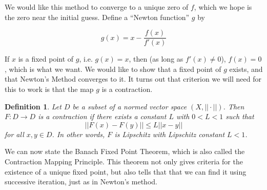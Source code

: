 \documentclass[10pt]{article}         %
\newtheorem{definition}{Definition}[section]
\theoremstyle{remark}
\begin{document}
We would like this method to converge to a unique zero of $f$, which we hope is the zero near the initial guess. Define a ``Newton function'' $g$ by

\[
g(x) = x - \frac{f(x)}{f'(x)}
\]

If $x$ is a fixed point of $g$, i.e. $g(x) = x$, then (as long as $f'(x) \neq 0$), $f(x) = 0$, which is what we want. We would like to show that a fixed point of $g$ exists, and that Newton's Method converges to it. It turns out that criterion we will need for this to work is that the map $g$ is a contraction.

\begin{definition}Let $D$ be a subset of a normed vector space $(X, ||\cdot||)$. Then $F: D \rightarrow D$ is a \emph{contraction} if there exists a constant $L$ with $0 < L < 1$ such that 
\[
||F(x) - F(y)|| \leq L ||x - y||
\]
for all $x, y \in D$. In other words, $F$ is Lipschitz with Lipschitz constant $L < 1$.
\end{definition}

We can now state the Banach Fixed Point Theorem, which is also called the Contraction Mapping Principle. This theorem not only gives criteria for the existence of a unique fixed point, but also tells that that we can find it using successive iteration, just as in Newton's method. 
\end{document}
